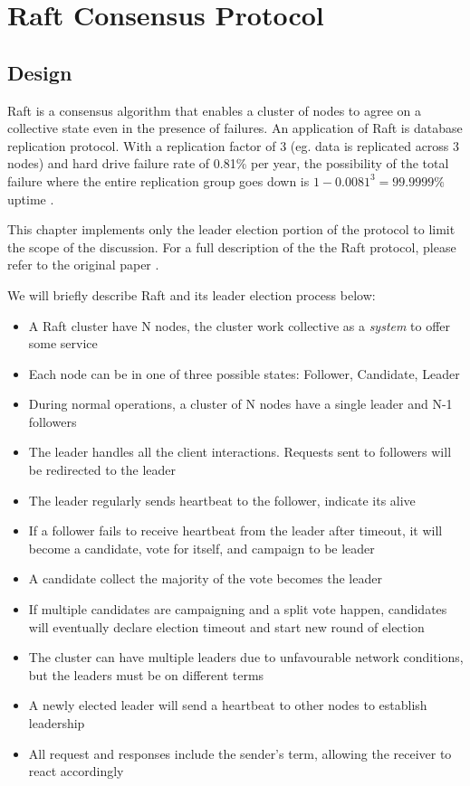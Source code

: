 % 

\chapter{Raft Consensus Protocol}

\section{Design}

Raft is a consensus algorithm that enables a cluster of nodes to agree on a
collective state even in the presence of failures. An application of Raft is
database replication protocol. With a replication factor of 3 (eg. data is
replicated across 3 nodes) and hard drive failure rate of 0.81\% per year, the
possibility of the total failure where the entire replication group goes down is
$1-0.0081^3 = 99.9999\%$ uptime \cite{backblaze}.\newline

This chapter implements only the leader election portion of the protocol to
limit the scope of the discussion. For a full description of the the Raft
protocol, please refer to the original paper \cite{raft}.\newline

We will briefly describe Raft and its leader election process below: 
\begin{itemize}
    \item A Raft cluster have N nodes, the cluster work collective as a
    \textit{system} to offer some service
    \item Each node can be in one of three possible states: Follower, Candidate, Leader
    \item During normal operations, a cluster of N nodes have a single leader
    and N-1 followers
    \item The leader handles all the client interactions. Requests sent to followers will be 
    redirected to the leader
    \item The leader regularly sends heartbeat to the follower, indicate its
    alive
    \item If a follower fails to receive heartbeat from the leader after
    timeout, it will become a candidate, vote for itself, and campaign to be
    leader
    \item A candidate collect the majority of the vote becomes the leader
    \item If multiple candidates are campaigning and a split vote happen,
    candidates will eventually declare election timeout and start new round of
    election
    \item The cluster can have multiple leaders due to unfavourable network conditions, 
    but the leaders must be on different terms 
    \item A newly elected leader will send a heartbeat to other nodes to establish 
    leadership 
    \item All request and responses include the sender's term, allowing the
    receiver to react accordingly
\end{itemize}


